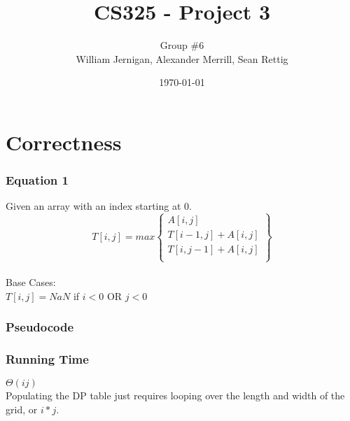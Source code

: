 \documentclass{article}
\title{CS325 - Project 3}
\author{Group \#6 \\ William Jernigan, Alexander Merrill, Sean Rettig}
\date{\today}
\begin{document}
\maketitle

\part*{Correctness}
\section*{Equation 1}
Given an array with an index starting at 0.\\

\[ T[i,j] = max \left\{ \begin{array}{ll}
    A[i,j]\\
    T[i-1,j] + A[i,j]\\
    T[i,j-1] + A[i,j]\\\end{array} \right\} \] \\
Base Cases:\\
$T[i,j] = NaN$ if $i < 0$ OR $j < 0$


\section*{Pseudocode}


\section*{Running Time}
$\Theta(ij)$\\
Populating the DP table just requires looping over the length and width of the grid, or $i * j$.
\end{document}

